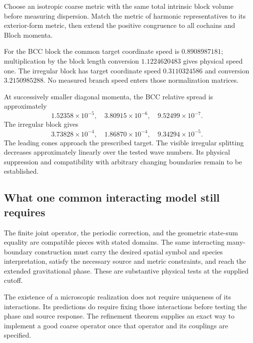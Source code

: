 Choose an isotropic coarse metric with the same total intrinsic block volume before measuring dispersion. Match the metric of harmonic representatives to its exterior-form metric, then extend the positive congruence to all cochains and Bloch momenta.

For the BCC block the common target coordinate speed is $0.8908987181$; multiplication by the block length conversion $1.1224620483$ gives physical speed one. The irregular block has target coordinate speed $0.3110324586$ and conversion $3.2150985288$. No measured branch speed enters those normalization matrices.

At successively smaller diagonal momenta, the BCC relative spread is approximately
\begin{equation}
1.52358\times10^{-5},\quad3.80915\times10^{-6},\quad
9.52499\times10^{-7}.
\end{equation}
The irregular block gives
\begin{equation}
3.73828\times10^{-4},\quad1.86870\times10^{-4},\quad
9.34294\times10^{-5}.
\end{equation}
The leading cones approach the prescribed target. The visible irregular splitting decreases approximately linearly over the tested wave numbers. Its physical suppression and compatibility with arbitrary changing boundaries remain to be established.

\subsection{What one common interacting model still requires}

The finite joint operator, the periodic correction, and the geometric state-sum equality are compatible pieces with stated domains. The same interacting many-boundary construction must carry the desired spatial symbol and species interpretation, satisfy the necessary source and metric constraints, and reach the extended gravitational phase. These are substantive physical tests at the supplied cutoff.

The existence of a microscopic realization does not require uniqueness of its interactions. Its predictions do require fixing those interactions before testing the phase and source response. The refinement theorem supplies an exact way to implement a good coarse operator once that operator and its couplings are specified.
